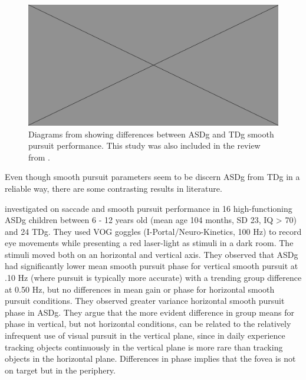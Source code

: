 \begin{figure}[h]
  \centering
  \includegraphics[width=.5\textwidth]{figures/placeholderImg.jpg}
  \caption[pursuit measurements ASDg]{Diagrams from \cite{takarae2004smoothpursuit} showing differences between ASDg and TDg smooth pursuit performance. This study was also included in the review from \cite{johnson2016review}.}
  \label{fig:pursuitASDg}
\end{figure}

Even though smooth pursuit parameters seem to be discern ASDg from TDg in a reliable way, there are some contrasting results in literature.

\cite{wilkes2015oculomotor} investigated on saccade and smooth pursuit performance in 16 high-functioning ASDg children between 6 - 12 years old (mean age 104 months, SD 23, IQ > 70) and 24 TDg. They used VOG goggles (I-Portal/Neuro-Kinetics, 100 Hz) to record eye movements while presenting a red laser-light as stimuli in a dark room. The stimuli moved both on an horizontal and vertical axis. They observed that ASDg had significantly lower mean smooth pursuit phase for vertical smooth pursuit at .10 Hz (where pursuit is typically more accurate) with a trending group difference at 0.50 Hz, but no differences in mean gain or phase for horizontal smooth pursuit conditions. They observed greater variance horizontal smooth pursuit phase in ASDg. They argue that the more evident difference in group means for phase in vertical, but not horizontal conditions, can be related to the relatively infrequent use of visual pursuit in the vertical plane, since in daily experience tracking objects continuously in the vertical plane is more rare than tracking objects in the horizontal plane. Differences in phase implies that the fovea is not on target but in the periphery.

